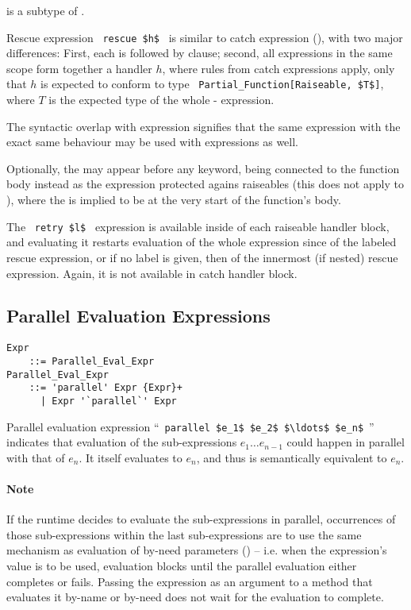  is a subtype of . 

Rescue expression ~\lstinline!rescue $h$!~ is similar to catch expression (), with two major differences: First, each  is followed by  clause; second, all  expressions in the same scope form together a handler $h$, where rules from catch expressions apply, only that $h$ is expected to conform to type ~\lstinline!Partial_Function[Raiseable, $T$]!, where $T$ is the expected type of the whole - expression. 

The syntactic overlap with  expression signifies that the same expression with the exact same behaviour may be used with  expressions as well. 

Optionally, the  may appear before any  keyword, being connected to the function body instead as the expression protected agains raiseables (this does not apply to ), where the  is implied to be at the very start of the function's body. 

The ~\lstinline!retry $l$!~ expression is available inside of each raiseable handler block, and evaluating it restarts evaluation of the whole expression since  of the labeled rescue expression, or if no label is given, then of the innermost (if nested) rescue expression. Again, it is not available in catch handler block. 






\subsection{Parallel Evaluation Expressions}
\label{sec:parallel-eval}

\grammar\begin{lstlisting}
Expr 
    ::= Parallel_Eval_Expr
Parallel_Eval_Expr
    ::= 'parallel' Expr {Expr}+
      | Expr '`parallel`' Expr
\end{lstlisting}

Parallel evaluation expression ``~\lstinline!parallel $e_1$ $e_2$ $\ldots$ $e_n$!~'' indicates that evaluation of the sub-expressions $e_1 \ldots e_{n-1}$ could happen in parallel with that of $e_n$. It itself evaluates to $e_n$, and thus is semantically equivalent to $e_n$.

\paragraph{Note} 
If the runtime decides to evaluate the sub-expressions in parallel, occurrences of those sub-expressions within the last sub-expressions are to use the same mechanism as evaluation of by-need parameters () -- i.e. when the expression's value is to be used, evaluation blocks until the parallel evaluation either completes or fails. Passing the expression as an argument to a method that evaluates it by-name or by-need does not wait for the evaluation to complete.





